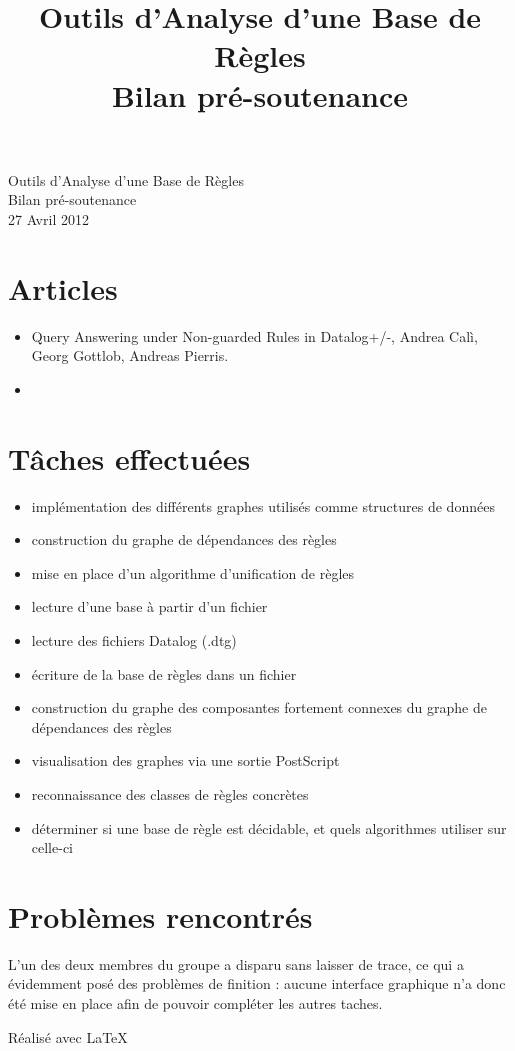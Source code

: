 \documentclass[a4paper]{article}
\title{Outils d'Analyse d'une Base de Règles\\Bilan pré-soutenance}
\begin{document}
\setlength{\parskip}{5mm plus2mm minus2mm}
\begin{center}
	\Huge 
	Outils d'Analyse d'une Base de Règles\\
	\huge
	Bilan pré-soutenance\\
	\Large
	27 Avril 2012
\end{center}

\large

\section{Articles}\label{articles}
\begin{itemize}
	\item 
	Query Answering under Non-guarded Rules in Datalog+/-, Andrea Calì, Georg Gottlob,
	Andreas Pierris.
	\item 

\end{itemize}

\section{Tâches effectuées}\label{tasks}
\begin{itemize}
	\item implémentation des différents graphes utilisés comme structures de données 
	\item construction du graphe de dépendances des règles
	\item mise en place d'un algorithme d'unification de règles
	\item lecture d'une base à partir d'un fichier
	\item lecture des fichiers Datalog (.dtg)
	\item écriture de la base de règles dans un fichier
	\item construction du graphe des composantes fortement connexes du graphe de
	dépendances des règles
	\item visualisation des graphes via une sortie PostScript 
	\item reconnaissance des classes de règles concrètes
	\item déterminer si une base de règle est décidable, et quels algorithmes utiliser
	sur celle-ci
\end{itemize}

\section{Problèmes rencontrés}\label{problems}
L'un des deux membres du groupe a disparu sans laisser de trace, ce qui a évidemment posé
des problèmes de finition : aucune interface graphique n'a donc été mise en place afin de
pouvoir compléter les autres taches.


\vfill
{\raggedleft R\'ealis\'e avec \LaTeX{} \par}
\end{document}
